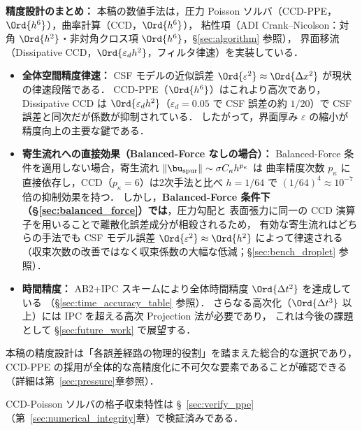 \noindent\textbf{精度設計のまとめ：}
\label{sec:accuracy_summary}
本稿の数値手法は，圧力 Poisson ソルバ（CCD-PPE，$\Ord{h^6}$），曲率計算（CCD，$\Ord{h^6}$），
粘性項（ADI Crank--Nicolson：対角 $\Ord{h^2}$・非対角クロス項 $\Ord{h^6}$，§\ref{sec:algorithm} 参照），
界面移流（Dissipative CCD，$\Ord{\varepsilon_d h^2}$，フィルタ律速）を実装している．

\begin{itemize}[noitemsep]
  \item \textbf{全体空間精度律速：}
        CSF モデルの近似誤差 $\Ord{\varepsilon^2} \approx \Ord{\Delta x^2}$ が現状の律速段階である．
        CCD-PPE（$\Ord{h^6}$）はこれより高次であり，
        Dissipative CCD は $\Ord{\varepsilon_d h^2}$（$\varepsilon_d=0.05$ で CSF 誤差の約 $1/20$）で
        CSF 誤差と同次だが係数が抑制されている．
        したがって，界面厚み $\varepsilon$ の縮小が精度向上の主要な鍵である．
  \item \textbf{寄生流れへの直接効果（Balanced-Force なしの場合）：}
        Balanced-Force 条件を適用しない場合，寄生流れ $\|\bu_{\text{spur}}\| \sim \sigma C_\kappa h^{p_\kappa}$ は
        曲率精度次数 $p_\kappa$ に直接依存し，CCD（$p_\kappa=6$）は2次手法と比べ
        $h=1/64$ で $(1/64)^4 \approx 10^{-7}$ 倍の抑制効果を持つ．
        しかし，\textbf{Balanced-Force 条件下（§\ref{sec:balanced_force}）では}，圧力勾配と
        表面張力に同一の CCD 演算子を用いることで離散化誤差成分が相殺されるため，
        有効な寄生流れはどちらの手法でも CSF モデル誤差 $\Ord{\varepsilon^2} \approx \Ord{h^2}$
        によって律速される（収束次数の改善ではなく収束係数の大幅な低減；§\ref{sec:bench_droplet} 参照）．
  \item \textbf{時間精度：} AB2+IPC スキームにより全体時間精度 $\Ord{\Delta t^2}$ を達成している
        （§\ref{sec:time_accuracy_table} 参照）．
        さらなる高次化（$\Ord{\Delta t^3}$ 以上）には IPC を超える高次 Projection 法が必要であり，
        これは今後の課題として §\ref{sec:future_work} で展望する．
\end{itemize}
本稿の精度設計は「各誤差経路の物理的役割」を踏まえた総合的な選択であり，
CCD-PPE の採用が全体的な高精度化に不可欠な要素であることが確認できる（詳細は第~\ref{sec:pressure}章参照）．

\noindent CCD-Poisson ソルバの格子収束特性は
§~\ref{sec:verify_ppe}（第~\ref{sec:numerical_integrity}章）で検証済みである．
